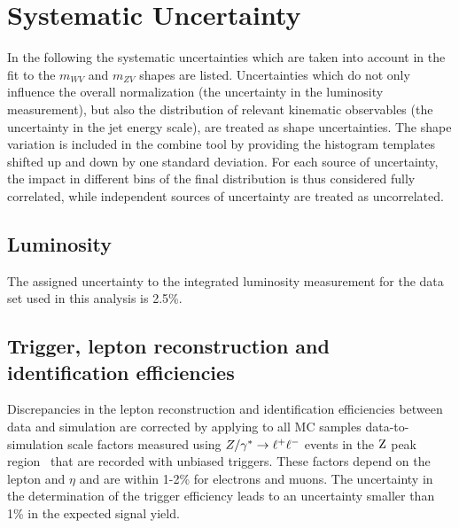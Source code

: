 \section{Systematic Uncertainty} %
\label{sec:systematic_uncertanity}
In the following the systematic uncertainties which are taken into account in the fit to the $m_{WV}$ and $m_{ZV}$ shapes are listed.  
Uncertainties which do not only influence the overall normalization (\eg the uncertainty in the luminosity measurement), but also the distribution of relevant kinematic observables (\eg the uncertainty in the jet energy scale), are treated as shape uncertainties.
The shape variation is included in the combine tool by providing the histogram templates shifted up and down by one standard deviation.
For each source of uncertainty, the impact in different bins of the final distribution is thus considered fully correlated, while independent sources of uncertainty are treated as uncorrelated. 

\subsection{Luminosity}

The assigned uncertainty to the integrated luminosity measurement for
the data set used in this analysis is 2.5\%.

\subsection{Trigger, lepton reconstruction and identification efficiencies}

Discrepancies in the lepton reconstruction and identification
efficiencies between data and simulation are corrected by applying
to all MC samples 
data-to-simulation scale factors measured using $Z/\gamma^*\to\ell^+\ell^-$ events in the $\mathrm{Z}$
peak region~\cite{Tag_probe} that are recorded with unbiased triggers. These factors
depend on the lepton \pt and $\eta$ and are within 1-2\% for electrons and muons.
The uncertainty in the determination of the trigger efficiency leads to an uncertainty smaller than 1\% in the expected signal yield. 


